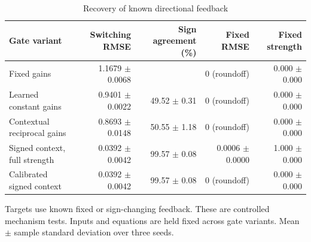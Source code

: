 \begin{table}[t]
\centering
\small
\caption{Recovery of known directional feedback}
\label{tab:controlled_feedback}
\begin{tabular}{@{}lrrrr@{}}
\toprule
\textbf{Gate variant} & \textbf{Switching RMSE} & \textbf{Sign agreement (\%)} & \textbf{Fixed RMSE} & \textbf{Fixed strength} \\
\midrule
Fixed gains & 1.1679 \ensuremath{\pm} 0.0068 & \textemdash{} & 0 (roundoff) & 0.000 \ensuremath{\pm} 0.000 \\
Learned constant gains & 0.9401 \ensuremath{\pm} 0.0022 & 49.52 \ensuremath{\pm} 0.31 & 0 (roundoff) & 0.000 \ensuremath{\pm} 0.000 \\
Contextual reciprocal gains & 0.8693 \ensuremath{\pm} 0.0148 & 50.55 \ensuremath{\pm} 1.18 & 0 (roundoff) & 0.000 \ensuremath{\pm} 0.000 \\
Signed context, full strength & 0.0392 \ensuremath{\pm} 0.0042 & 99.57 \ensuremath{\pm} 0.08 & 0.0006 \ensuremath{\pm} 0.0000 & 1.000 \ensuremath{\pm} 0.000 \\
Calibrated signed context & 0.0392 \ensuremath{\pm} 0.0042 & 99.57 \ensuremath{\pm} 0.08 & 0 (roundoff) & 0.000 \ensuremath{\pm} 0.000 \\
\bottomrule
\end{tabular}
\par\medskip
\begin{minipage}{0.98\linewidth}\footnotesize Targets use known fixed or sign-changing feedback. These are controlled mechanism tests. Inputs and equations are held fixed across gate variants. Mean \ensuremath{\pm} sample standard deviation over three seeds.\end{minipage}
\end{table}
